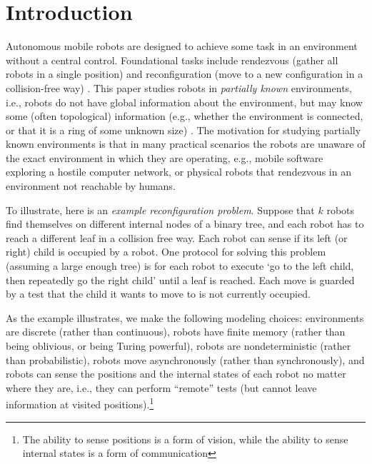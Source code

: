 \documentclass{llncs}
\begin{document}
\section{Introduction} \label{sec:intro}
\vspace{-1mm}
Autonomous mobile robots are designed to achieve some task in an environment without a central control. Foundational tasks include rendezvous (gather all robots in a single position) and reconfiguration (move to a new configuration in a collision-free way) \cite{KKR07handbook,FPS11,FPS12}.
This paper studies robots in {\em partially known} environments, i.e., robots do not have global information about the environment, but may know some (often topological) information (e.g., whether the environment is connected, or that it is a ring of some unknown size) \cite{FPS11}. The motivation for studying partially known environments is that in many practical scenarios the robots are unaware of the exact environment in which they are operating, e.g., mobile software exploring a hostile computer network, or physical robots that rendezvous in an environment not reachable by humans.%

To illustrate, here is an {\em example reconfiguration problem}. Suppose that $k$ robots find themselves on different internal nodes of a binary tree, and each robot has to reach a different leaf in a collision free way. Each robot can sense if its left (or right) child is occupied by a robot. One protocol for solving this problem (assuming a large enough tree) is for each robot to execute `go to the left child, then repeatedly go the right child' until a leaf is reached. Each move is guarded by a test that the child it wants to move to is not currently occupied.

As the example illustrates, we make the following modeling choices: environments are discrete (rather than continuous), robots have finite memory (rather than being oblivious, or being Turing powerful), robots are nondeterministic (rather than probabilistic), robots move asynchronously (rather than synchronously), and robots can sense the positions and the internal states of each robot no matter where they are, i.e., they can perform ``remote'' tests 
(but cannot leave information at visited positions).\footnote{The ability to sense positions is a form of vision, while the ability to sense internal states is a form of communication}
\end{document}

